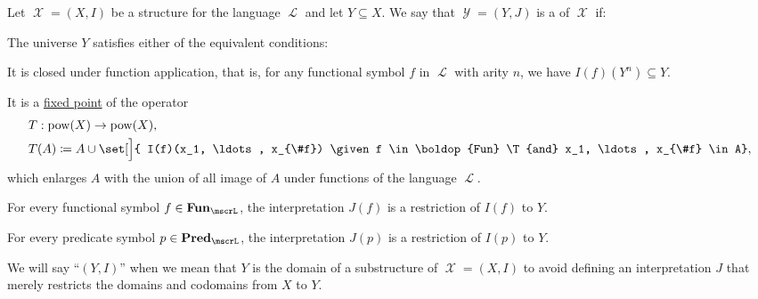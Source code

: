 \begin{definition}\label{def:first_order_substructure}
  Let \( \mscrX = (X, I) \) be a structure for the language \( \mscrL \) and let \( Y \subseteq X \). We say that \( \mscrY = (Y, J) \) is a  of \( \mscrX \) if:

  \begin{thmenum}
     The universe \( Y \) satisfies either of the equivalent conditions:

    \begin{thmenum}
       It is closed under function application, that is, for any functional symbol \( f \) in \( \mscrL \) with arity \( n \), we have \( I(f)(Y^n) \subseteq Y \).

       It is a \hyperref[def:fixed_point]{fixed point} of the operator
      \begin{equation*}
        \begin{aligned}
          &T: \pow(X) \to \pow(X), \\
          &T(A) \coloneqq A \cup \set[\Big]{ I(f)(x_1, \ldots, x_{\#f}) \given f \in \boldop{Fun} \T{and} x_1, \ldots, x_{\#f} \in A},
        \end{aligned}
      \end{equation*}
      which enlarges \( A \) with the union of all image of \( A \) under functions of the language \( \mscrL \).
    \end{thmenum}

     For every functional symbol \( f \in \boldop{Fun}_\mscrL \), the interpretation \( J(f) \) is a restriction of \( I(f) \) to \( Y \).

     For every predicate symbol \( p \in \boldop{Pred}_\mscrL \), the interpretation \( J(p) \) is a restriction of \( I(p) \) to \( Y \).
  \end{thmenum}
\end{definition}
\begin{comments}
  \item We will say \enquote{\( (Y, I) \)} when we mean that \( Y \) is the domain of a substructure of \( \mscrX = (X, I) \) to avoid defining an interpretation \( J \) that merely restricts the domains and codomains from \( X \) to \( Y \).
\end{comments}
